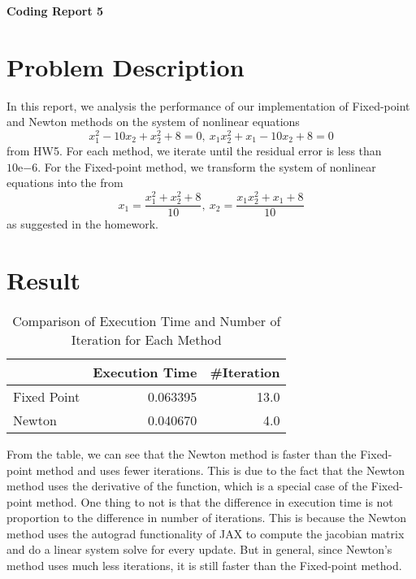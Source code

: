 \documentclass[a4paper,12pt]{article}
\begin{document}
\begin{center} %
	{\Large \bf Coding Report 5} %
	\vspace{2mm}
\end{center}  


\section{Problem Description}

In this report, we analysis the performance of our implementation of Fixed-point and Newton methods
on the system of nonlinear equations
$$
x_1^2 - 10x_2 + x_2^2 + 8 = 0,\:
x_1x_2^2 + x_1 - 10x_2 + 8 = 0
$$
from HW5.
For each method, we iterate until the residual error is less than $10\mathrm{e}{-6}$.
For the Fixed-point method,
we transform the system of nonlinear equations into the from
$$
x_1 = \frac{x_1^2 + x_2^2 + 8}{10},\:
x_2 = \frac{x_1x_2^2 + x_1 + 8}{10}
$$
as suggested in the homework.

\section{Result}

\begin{table}[h]
\begin{center}
	\begin{tabular}{lrr}
    \toprule
    {} &  Execution Time &  \#Iteration \\
    \midrule
    Fixed Point &        0.063395 &        13.0 \\
    Newton      &        0.040670 &         4.0 \\
    \bottomrule
    \end{tabular}
    \caption{Comparison of Execution Time and Number of Iteration for Each Method}
\end{center}
\end{table}

From the table, we can see that the Newton method is faster than the Fixed-point method
and uses fewer iterations.
This is due to the fact that the Newton method uses the derivative of the function,
which is a special case of the Fixed-point method.
One thing to not is that the difference in execution time 
is not proportion to the difference in number of iterations.
This is because the Newton method uses the autograd functionality of JAX to compute the jacobian matrix
and do a linear system solve for every update.
But in general, since Newton's method uses much less iterations,
it is still faster than the Fixed-point method.
\end{document}
